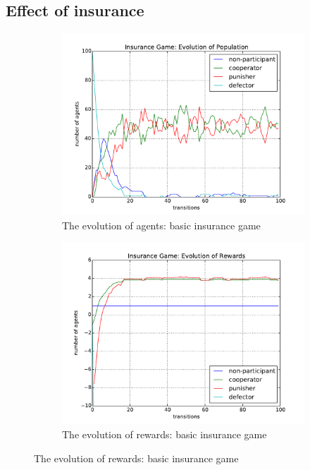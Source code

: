 \documentclass[11pt]{article}
\begin{document}
\subsection{Effect of insurance}
\begin{figure}[!h]
 \caption{Basic insurance game}
 \begin{subfigure}{.5\textwidth}
   \caption{The evolution of agents: basic insurance game}
   \includegraphics[scale = 0.4]{10.pdf}
 \end{subfigure}
 \begin{subfigure}{.5\textwidth}
   \label{}
   \centering
   \caption{The evolution of rewards: basic insurance game}
   \includegraphics[scale = 0.4]{11.pdf}
 \end{subfigure}
\end{figure}
\end{document}
